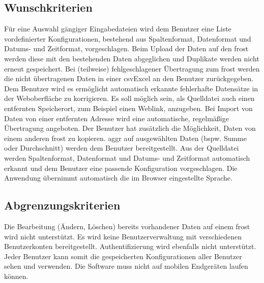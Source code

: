 \documentclass[a4paper, 12 pt]{article}
\begin{document}
	\subsection{Wunschkriterien}
	
	
	Für eine Auswahl gängiger Eingabedateien wird dem Benutzer eine Liste vordefinierter Konfigurationen, bestehend aus Spaltenformat, Datenformat und Datums- und Zeitformat, vorgeschlagen.
	Beim Upload der Daten auf den \gls{frost} werden diese mit den bestehenden Daten abgeglichen und Duplikate werden nicht erneut gespeichert.
	Bei (teilweise) fehlgeschlagener Übertragung zum \gls{frost} werden die nicht übertragenen Daten in einer \gls{csvExcel} an den Benutzer zurückgegeben.
	Dem Benutzer wird es ermöglicht automatisch erkannte fehlerhafte Datensätze in der Weboberfläche zu korrigieren.
	Es soll möglich sein, als Quelldatei auch einen entfernten Speicherort, zum Beispiel einen Weblink, anzugeben.
	Bei Import von Daten von einer entfernten Adresse wird eine automatische, regelmäßige Übertragung angeboten.
	Der Benutzer hat zusätzlich die Möglichkeit, Daten von einem anderen \gls{frost} zu kopieren.
	\gls{aggr} auf ausgewählten Daten (bspw. Summe oder Durchschnitt) werden dem Benutzer bereitgestellt.
    Aus der Quelldatei werden Spaltenformat, Datenformat und Datums- und Zeitformat automatisch erkannt und dem Benutzer eine passende Konfiguration vorgeschlagen.
	Die Anwendung übernimmt automatisch die im Browser eingestellte Sprache.
	

	\subsection{Abgrenzungskriterien}
	
Die Bearbeitung (Ändern, Löschen) bereits vorhandener Daten auf einem \gls{frost} wird nicht unterstützt.
Es wird keine Benutzerverwaltung mit verschiedenen Benutzerkonten bereitgestellt. Authentifizierung wird ebenfalls nicht unterstützt.
Jeder Benutzer kann somit die gespeicherten Konfigurationen aller Benutzer sehen und verwenden.
	Die Software muss nicht auf mobilen Endgeräten laufen können.
\end{document}
